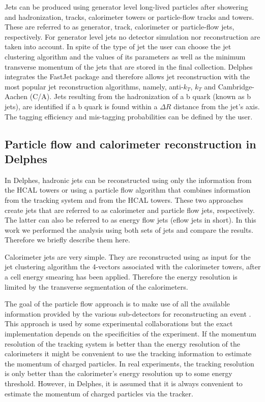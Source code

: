Jets can be produced using generator level long-lived particles after showering and hadronization, tracks, calorimeter towers or particle-flow tracks and towers. These are referred to as generator, track, calorimeter or particle-flow jets, respectively. For generator level jets no detector simulation nor reconstruction are taken into account. In spite of the type of jet the user can choose the jet clustering algorithm and the values of its parameters as well as the minimum transverse momentum of the jets that are stored in the final collection. Delphes integrates the FastJet package \cite{fastjet} and therefore allows jet reconstruction with the most popular jet reconstruction algorithms, namely, anti-$k_T$, $k_T$ and Cambridge-Aachen (C/A). 
Jets resulting from the hadronization of a b quark (known as b jets), are identified if a b quark is found within a $\Delta R$ distance from the jet's axis. The tagging efficiency and mis-tagging probabilities can be defined by the user. 

\subsection{Particle flow and calorimeter reconstruction in Delphes}

In Delphes, hadronic jets can be reconstructed using only the information from the HCAL towers or using a particle flow algorithm that combines information from the tracking system and from the HCAL towers. These two approaches create jets that are referred to as calorimeter and particle flow jets, respectively. The latter can also be referred to as energy flow jets (eflow jets in short). In this work we performed the analysis using both sets of jets and compare the results. Therefore we briefly describe them here.

Calorimeter jets are very simple. They are reconstructed using as input for the jet clustering algorithm the 4-vectors associated with the calorimeter towers, after a cell energy smearing has been applied. Therefore the energy resolution is limited by the transverse segmentation of the calorimeters.

The goal of the particle flow approach is to make use of all the available information provided by the various sub-detectors for reconstructing an event \cite{Delphes}. This approach is used by some experimental collaborations \cite{PF1,PF2} but the exact implementation depends on the specificities of the experiment. If the momentum resolution of the tracking system is better than the energy resolution of the calorimeters it might be convenient to use the tracking information to estimate the momentum of charged particles. In real experiments, the tracking resolution is only better than the calorimeter's energy resolution up to some energy threshold. However, in Delphes, it is assumed that it is always convenient to estimate the momentum of charged particles via the tracker. 

